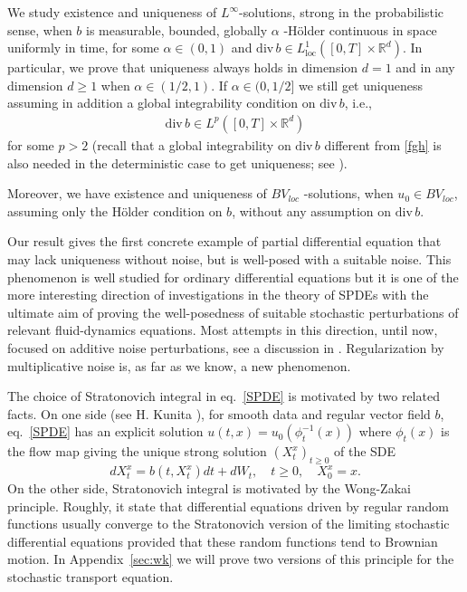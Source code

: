 \documentclass[a4paper,11pt]{article}
\newcommand{\RR}{\mathbb{R}}
\newcommand{\loc}{\mathrm{loc}}
\begin{document}
We study existence and uniqueness of $L^{\infty }$-solutions, strong
in the
probabilistic sense, when $b$ is measurable, bounded, globally ${\alpha }$%
-H\"{o}lder continuous in space uniformly in time, for some ${\alpha
}\in (0,1) $ and ${\mathrm{div}\,}b \in L^1_\loc([0,T]\times\RR^d)$.
 In particular, we prove that
  uniqueness always holds  in dimension $d=1$ and
   in any dimension $d \ge 1$
 when $\alpha \in (1/2, 1)$. If $\alpha \in (0, 1/2]$ we still get
uniqueness assuming in addition a global integrability condition on
${\mathrm{div}}\, b$, i.e.,
  \begin{align}\label{fgh}
 {\mathrm{div}\,} b\in L^{p} ( [0,T]\times{\mathbb{R}}^{d} )
 \end{align}
 for some $ p>2$ (recall that a  global integrability
 on ${\mathrm{div}} \, b$  different from \eqref{fgh}
  is  also needed in
the deterministic case to get uniqueness; see
\cite{DiPernaLions,Ambrosio}).

  Moreover, we have existence and uniqueness of $BV_{loc}$%
-solutions, when $u_{0}\in BV_{loc}$, assuming only the H\"{o}lder
condition on $b$, without any assumption on ${\mathrm{div}\,}b$.

Our result gives the first concrete example of partial differential equation
that may lack uniqueness without noise, but is well-posed with a suitable
noise. This phenomenon is well studied for ordinary differential equations
but it is one of the more interesting direction of investigations in the
theory of SPDEs with the ultimate aim of proving the well-posedness of
suitable stochastic perturbations of relevant fluid-dynamics equations. Most
attempts in this direction, until now, focused on additive noise
perturbations, see a discussion in \cite{AFS}. Regularization by
multiplicative noise is, as far as we know, a new phenomenon.

The choice of Stratonovich integral in eq.~\eqref{SPDE} is motivated by two
related facts. On one side (see H. Kunita \cite{K1}), for smooth data and
regular vector field $b$, eq.~\eqref{SPDE} has an explicit solution $%
u(t,x)=u_{0}(\phi _{t}^{-1}(x))$ where $\phi _{t}(x)$ is the flow map giving
the unique strong solution $(X_{t}^{x})_{t\ge 0}$ of the SDE
\begin{equation}
dX_{t}^{x}=b\left( t,X_{t}^{x}\right) dt+dW_{t},\quad t\geq 0,\quad
X_{0}^{x}=x.  \label{SDE intro}
\end{equation}
On the other side, Stratonovich integral is motivated by the Wong-Zakai
principle. Roughly, it state that differential equations driven by regular
random functions usually converge to the Stratonovich version of the
limiting stochastic differential equations provided that these random
functions tend to Brownian motion. In Appendix~\ref{sec:wk} we will prove two
versions of this principle for the stochastic transport equation.
\end{document}
